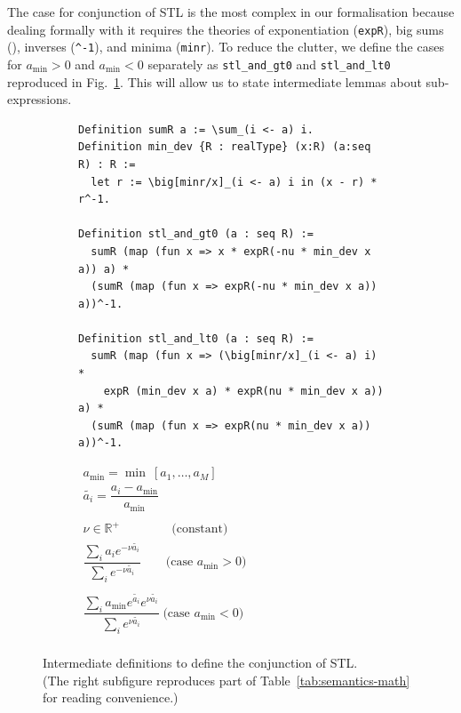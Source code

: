 \documentclass[a4paper,UKenglish,cleveref, autoref, thm-restate]{lipics-v2021}
\def\coqin#1{\texttt{#1}}
\newcommand{\Real}{{\mathbb R}}
\def\STL{\textrm{STL}}
\begin{document}
The case for conjunction of \STL{} is the most complex in our
formalisation because dealing formally with it requires the theories
of exponentiation (\coqin{expR}), big sums (\coqin{\sum}), inverses
(\coqin{^-1}), and minima (\coqin{minr}).
%
To reduce the clutter, we define the cases for $a_{\min} > 0$ and $a_{\min} < 0$ separately
as \coqin{stl_and_gt0} and \coqin{stl_and_lt0} reproduced in Fig.~\ref{fig:semantics-lt0-gt0}.
%
This will allow us to state intermediate lemmas about sub-expressions.

\begin{figure}[h]
\begin{subfigure}[]{0.66\textwidth}
\begin{verbatim}
Definition sumR a := \sum_(i <- a) i.
Definition min_dev {R : realType} (x:R) (a:seq R) : R :=
  let r := \big[minr/x]_(i <- a) i in (x - r) * r^-1.
		
Definition stl_and_gt0 (a : seq R) :=
  sumR (map (fun x => x * expR(-nu * min_dev x a)) a) *
  (sumR (map (fun x => expR(-nu * min_dev x a)) a))^-1.
  
Definition stl_and_lt0 (a : seq R) :=
  sumR (map (fun x => (\big[minr/x]_(i <- a) i) *
    expR (min_dev x a) * expR(nu * min_dev x a)) a) *
  (sumR (map (fun x => expR(nu * min_dev x a)) a))^-1.
\end{verbatim}
\end{subfigure}
\;
\vrule
\;
\begin{subfigure}[]{0.3\textwidth}
\footnotesize
$
\begin{array}{l}
a_{\min} = \min\ [a_1, \ldots, a_M] \\
\tilde{a_i} = \dfrac{a_i - a_{\min}}{a_{\min}}\\
\\
\nu \in \Real^+
\quad\quad\quad\;\;\;\text{ (constant)} \\
\dfrac{\sum_i a_i e^{-\nu \tilde{a_i}}}{\sum_i e^{-\nu \tilde{a_i}}}
\quad\quad\text{(case }a_{\min} > 0\text{)} \\
\\
\dfrac{\sum_i a_{\min} e^{\tilde{a_i}} 
	e^{\nu 
		\tilde{a_i}}}{\sum_i e^{\nu 
		\tilde{a_i}}}  
\;\text{(case }a_{\min} < 0\text{)} \\
\end{array}
$
\end{subfigure}
\setlength{\belowcaptionskip}{5pt}
\caption{Intermediate definitions to define the conjunction of \STL{}.\\
{\footnotesize (The right subfigure reproduces part of Table~\ref{tab:semantics-math} for reading convenience.)}}
\label{fig:semantics-lt0-gt0}
\end{figure}
\end{document}
